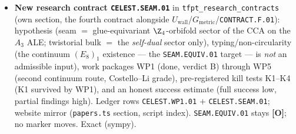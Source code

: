 \documentclass[11pt]{article}
\providecommand{\mO}{\textbf{[O]}}\providecommand{\mX}{\textbf{[X]}}
\providecommand{\Aut}{\operatorname{Aut}}
\begin{document}
\begin{itemize}[leftmargin=1.5em]
killed three ways, the false glue breaks additivity on $3112/6720$ pairs, rigidity $=\Aut(\Z_4)$.
\item \textbf{New research contract \texttt{CELEST.SEAM.01}} in \texttt{tfpt\_research\_contracts} (own
section, the fourth contract alongside $U_{\mathrm{wall}}$/$G_{\mathrm{metric}}$/\texttt{CONTRACT.F.01}):
hypothesis (seam $=$ glue-equivariant $\Z_4$-orbifold sector of the CCA on the $A_3$ ALE; twistorial bulk $=$
the \emph{self-dual} sector only), typing/non-circularity (the continuum $(E_8)_1$ existence --- the
\texttt{SEAM.EQUIV.01} target --- is \emph{not} an admissible input), work packages WP1 (done, verdict B)
through WP5 (second continuum route, Costello--Li grade), pre-registered kill tests K1--K4 (K1 survived by
WP1), and an honest success estimate (full success low, partial findings high). Ledger rows
\texttt{CELEST.WP1.01} $+$ \texttt{CELEST.SEAM.01}; website mirror (\texttt{papers.ts} section, script
index). \texttt{SEAM.EQUIV.01} stays \mO; no marker moves. Exact (sympy).
\end{itemize}
\end{document}
